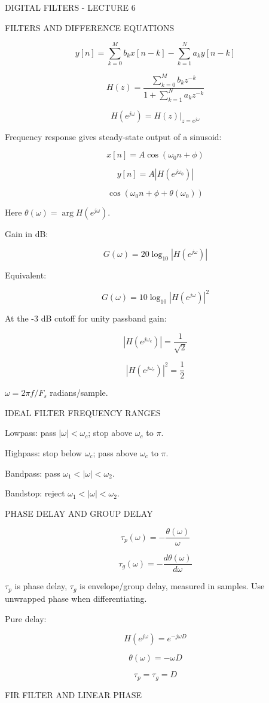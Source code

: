 DIGITAL FILTERS - LECTURE 6

FILTERS AND DIFFERENCE EQUATIONS

$$y[n]=\sum_{k=0}^{M}b_kx[n-k]-\sum_{k=1}^{N}a_ky[n-k]$$

$$H(z)=\frac{\sum_{k=0}^{M}b_kz^{-k}}{1+\sum_{k=1}^{N}a_kz^{-k}}$$

$$H(e^{j\omega})=H(z)|_{z=e^{j\omega}}$$

Frequency response gives steady-state output of a sinusoid:

$$x[n]=A\cos(\omega_0n+\phi)$$

$$y[n]=A|H(e^{j\omega_0})|$$

$$\cos(\omega_0n+\phi+\theta(\omega_0))$$

Here $\theta(\omega)=\arg H(e^{j\omega})$.

Gain in dB:

$$G(\omega)=20\log_{10}|H(e^{j\omega})|$$

Equivalent:

$$G(\omega)=10\log_{10}|H(e^{j\omega})|^2$$

At the -3 dB cutoff for unity passband gain:

$$|H(e^{j\omega_c})|=\frac{1}{\sqrt{2}}$$

$$|H(e^{j\omega_c})|^2=\frac12$$

$\omega=2\pi f/F_s$ radians/sample.

IDEAL FILTER FREQUENCY RANGES

Lowpass: pass $|\omega|<\omega_c$; stop above $\omega_c$ to $\pi$.

Highpass: stop below $\omega_c$; pass above $\omega_c$ to $\pi$.

Bandpass: pass $\omega_1<|\omega|<\omega_2$.

Bandstop: reject $\omega_1<|\omega|<\omega_2$.

PHASE DELAY AND GROUP DELAY

$$\tau_p(\omega)=-\frac{\theta(\omega)}{\omega}$$

$$\tau_g(\omega)=-\frac{d\theta(\omega)}{d\omega}$$

$\tau_p$ is phase delay, $\tau_g$ is envelope/group delay, measured in samples. Use unwrapped phase when differentiating.

Pure delay:

$$H(e^{j\omega})=e^{-j\omega D}$$

$$\theta(\omega)=-\omega D$$

$$\tau_p=\tau_g=D$$

FIR FILTER AND LINEAR PHASE

